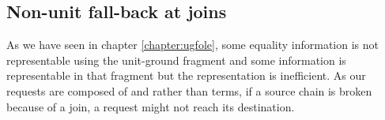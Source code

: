 %
%

\subsection{Non-unit fall-back at joins}\label{section:gfole:EC-graphs:non_unit_fallback}
As we have seen in chapter \ref{chapter:ugfole}, some equality information is not representable using the unit-ground fragment and some information is representable in that fragment but the representation is inefficient. As our requests are composed of \GFAs{} and \GTs{} rather than terms, if a source chain is broken because of a join, a request might not reach its destination.

